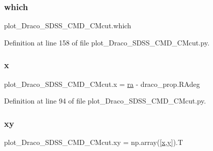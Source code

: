 \subsubsection{\texorpdfstring{which}{which}}
{\footnotesize\ttfamily plot\+\_\+\+Draco\+\_\+\+S\+D\+S\+S\+\_\+\+C\+M\+D\+\_\+\+C\+Mcut.\+which}



Definition at line 158 of file plot\+\_\+\+Draco\+\_\+\+S\+D\+S\+S\+\_\+\+C\+M\+D\+\_\+\+C\+Mcut.\+py.

\mbox{\label{namespaceplot__Draco__SDSS__CMD__CMcut_a67531d4792e3019b4dc270001b538121}} 
\subsubsection{\texorpdfstring{x}{x}}
{\footnotesize\ttfamily plot\+\_\+\+Draco\+\_\+\+S\+D\+S\+S\+\_\+\+C\+M\+D\+\_\+\+C\+Mcut.\+x = \hyperlink{namespaceplot__Draco__SDSS__CMD__CMcut_a1d4f3338e366e359d28b436e627317ad}{ra} -\/ draco\+\_\+prop.\+R\+Adeg}



Definition at line 94 of file plot\+\_\+\+Draco\+\_\+\+S\+D\+S\+S\+\_\+\+C\+M\+D\+\_\+\+C\+Mcut.\+py.

\mbox{\label{namespaceplot__Draco__SDSS__CMD__CMcut_a9fc80a687c10d13188756f83e805ad6e}} 
\subsubsection{\texorpdfstring{xy}{xy}}
{\footnotesize\ttfamily plot\+\_\+\+Draco\+\_\+\+S\+D\+S\+S\+\_\+\+C\+M\+D\+\_\+\+C\+Mcut.\+xy = np.\+array(\mbox{[}\hyperlink{namespaceplot__Draco__SDSS__CMD__CMcut_a67531d4792e3019b4dc270001b538121}{x},\hyperlink{namespaceplot__Draco__SDSS__CMD__CMcut_ad2004cd6fb4127cd926a8619e568255b}{y}\mbox{]}).T}



